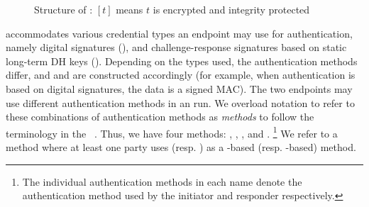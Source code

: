 \begin{figure}
\centering
{}
\caption{Structure of \mEdhoc{}: $[t]$ means $t$ is encrypted and integrity protected}
\label{fig:edhocFramework}
\end{figure}

\mEdhoc{} accommodates various credential types
an endpoint may use for authentication, 
%
namely 
digital signatures (\mSig), 
and
challenge-response signatures based on static long-term DH keys (\mStat).
%
Depending on the types used, the authentication methods differ,
and \mAuthi{} and \mAuthr{} are constructed accordingly (for example,  when authentication is based on digital signatures, the data is a signed MAC).
%
The two endpoints may use different authentication methods in an \mEdhoc{} run.
%
%
We overload notation to refer to these combinations of authentication methods as
\emph{methods} to follow the terminology in the \mEdhoc{}
\mSpec{}~\cite{selander-lake-edhoc-01}.
%
Thus, we have 
four 
methods: \mSigSig, \mSigStat, \mStatStat, and \mStatSig. %
%
\footnote{The individual authentication methods in each name denote the authentication method used by the initiator and responder respectively.}
%
We refer to a method where at least one party uses \mSig{} (resp. \mStat) as a \mSig-based (resp. \mStat-based)
method.
%

%

